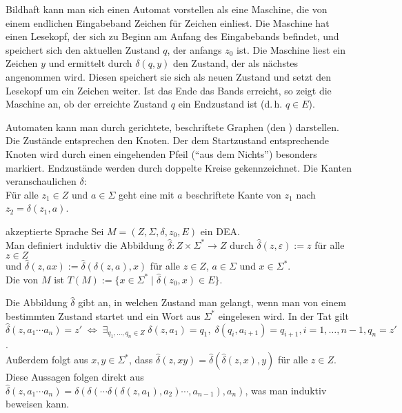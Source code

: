 \begin{Bem}
    Bildhaft kann man sich einen Automat vorstellen als eine Maschine,
    die von einem endlichen Eingabeband Zeichen für Zeichen einliest.
    Die Maschine hat einen Lesekopf, der sich zu Beginn am Anfang des
    Eingabebands befindet, und speichert sich den aktuellen Zustand $q$,
    der anfangs $z_0$ ist.
    Die Maschine liest ein Zeichen $y$ und ermittelt durch $\delta(q, y)$
    den Zustand, der als nächstes angenommen wird.
    Diesen speichert sie sich als neuen Zustand und setzt den Lesekopf um ein
    Zeichen weiter.
    Ist das Ende das Bands erreicht, so zeigt die Maschine an,
    ob der erreichte Zustand $q$ ein Endzustand ist
    (d.\,h. $q \in E$).
\end{Bem}

\begin{Bem}
    Automaten kann man durch gerichtete, beschriftete Graphen
    (den ) darstellen.
    Die Zustände entsprechen den Knoten.
    Der dem Startzustand entsprechende Knoten wird durch einen eingehenden
    Pfeil ("`aus dem Nichts"') besonders markiert.
    Endzustände werden durch doppelte Kreise gekennzeichnet.
    Die Kanten veranschaulichen $\delta$:\\
    Für alle $z_1 \in Z$ und $a \in \Sigma$ geht eine mit $a$ beschriftete
    Kante von $z_1$ nach $z_2 = \delta(z_1, a)$.
\end{Bem}

\linie

\begin{Def}{akzeptierte Sprache}
    Sei $M = (Z, \Sigma, \delta, z_0, E)$ ein DEA.\\
    Man definiert induktiv die Abbildung
    $\widehat{\delta}\colon Z \times \Sigma^\ast \rightarrow Z$ durch
    $\widehat{\delta}(z, \varepsilon) := z$ für alle $z \in Z$\\
    und $\widehat{\delta}(z, ax) := \widehat{\delta}(\delta(z, a), x)$ für alle
    $z \in Z$, $a \in \Sigma$ und $x \in \Sigma^\ast$.\\
    Die von $M$  ist
    $T(M) := \{x \in \Sigma^\ast \;|\; \widehat{\delta}(z_0, x) \in E\}$.
\end{Def}

\begin{Bem}
    Die Abbildung $\widehat{\delta}$ gibt an, in welchen Zustand man gelangt,
    wenn man von einem bestimmten Zustand startet und ein Wort aus
    $\Sigma^\ast$ eingelesen wird.
    In der Tat gilt\\
    $\widehat{\delta}(z, a_1 \dotsb a_n) = z'
    \;\Leftrightarrow\; \exists_{q_1, \dotsc, q_n \in Z}\;
    \delta(z, a_1) = q_1,\; \delta(q_i, a_{i+1}) = q_{i+1},
    i = 1, \dotsc, n - 1, q_n = z'$.\\
    Außerdem folgt aus $x, y \in \Sigma^\ast$, dass
    $\widehat{\delta}(z, xy) = \widehat{\delta}(\widehat{\delta}(z, x), y)$
    für alle $z \in Z$.\\
    Diese Aussagen folgen direkt aus
    $\widehat{\delta}(z, a_1 \dotsb a_n) =
    \delta(\delta(\dotsb\delta(\delta(z,
    a_1), a_2)\dotsb, a_{n-1}), a_n)$,
    was man induktiv beweisen kann.
\end{Bem}

